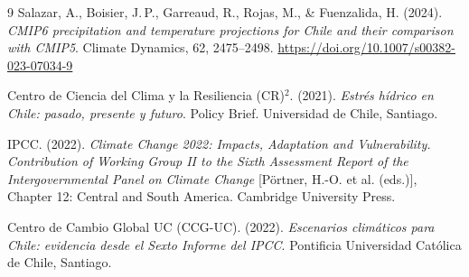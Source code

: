 \documentclass[12pt, a4paper]{article}
\begin{document}
\begin{thebibliography}{9}
Salazar, A., Boisier, J.\,P., Garreaud, R., Rojas, M., \& Fuenzalida, H. (2024). \textit{CMIP6 precipitation and temperature projections for Chile and their comparison with CMIP5}. Climate Dynamics, 62, 2475--2498. \url{https://doi.org/10.1007/s00382-023-07034-9}

Centro de Ciencia del Clima y la Resiliencia (CR)$^2$. (2021). \textit{Estrés hídrico en Chile: pasado, presente y futuro}. Policy Brief. Universidad de Chile, Santiago.

IPCC. (2022). \textit{Climate Change 2022: Impacts, Adaptation and Vulnerability. Contribution of Working Group II to the Sixth Assessment Report of the Intergovernmental Panel on Climate Change} [Pörtner, H.-O. et al. (eds.)], Chapter 12: Central and South America. Cambridge University Press.

Centro de Cambio Global UC (CCG-UC). (2022). \textit{Escenarios climáticos para Chile: evidencia desde el Sexto Informe del IPCC}. Pontificia Universidad Católica de Chile, Santiago.

\end{thebibliography}
\end{document}
